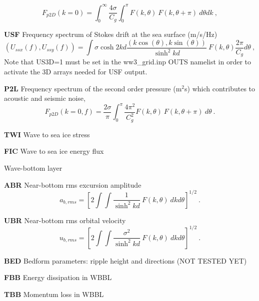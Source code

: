 \begin{list}{)\hfill}
\begin{list}{)\hfill}
      \begin{equation} F_{p2D}(k=0) = \int_0^{\infty} \frac{4 \sigma}{C_g} \int_0^{\pi}  F(k,\theta) \:  F(k,\theta+\pi) \:  d\theta dk
      \: , \label{eq:sop} \end{equation}
\item \textbf{USF} Frequency spectrum of Stokes drift at the sea surface (m/s/Hz)
     \begin{equation} (U_{ssx}(f),U_{ssy}(f)) =  \int \sigma \cosh 2kd \frac{(k \cos(\theta),k \sin(\theta))}
        {\sinh^2 kd}  \: F(k,\theta) \frac{2 \pi}{C_g} d\theta
      \: , \label{eq:Ussf} \end{equation}
Note that US3D=1 must be set in the ww3\_grid.inp OUTS namelist in order to activate the 3D arrays needed for USF output.
\item \textbf{P2L} Frequency spectrum of the second order pressure (m$^2$s)  which contributes to acoustic and seismic noise,
      \begin{equation} F_{p2D}(k=0,f) =  \frac{2 \sigma}{\pi} \int_0^{\pi}  \frac{4 \pi^2}{C_g^2} F(k,\theta) \:  F(k,\theta+\pi) \:  d\theta
      \: . \label{eq:sopf} \end{equation}
\item \textbf{TWI}   Wave to sea ice stress
\item \textbf{FIC}   Wave to sea ice energy flux
\end{list}

\item{Wave-bottom layer}

\begin{list}{)\hfill}
            { \leftmargin 8mm 
             \rightmargin 0mm \itemsep 0mm \parsep 0mm}

\item \textbf{ABR} Near-bottom rms excursion amplitude
      \begin{equation} a_{b,rms} = \left [ 2 \int \!\!\!\! \int
      \frac{1}{\sinh^2 kd} \: F(k,\theta) \: dk d\theta \right ] ^{1/2}
      \: . \label{eq:ab_rms} \end{equation}
\item \textbf{UBR} Near-bottom rms orbital velocity
      \begin{equation} u_{b,rms} = \left [ 2 \int \!\!\!\! \int
      \frac{\sigma^2}{\sinh^2 kd} \: F(k,\theta) \: dk d\theta \right ] ^{1/2}
      \: . \label{eq:ub_rms} \end{equation}
\item \textbf{BED} Bedform parameters: ripple height and directions (NOT TESTED YET)   
\item \textbf{FBB} Energy dissipation in WBBL 
\item \textbf{TBB} Momentum loss in WBBL 
\end{list}


\end{list}
